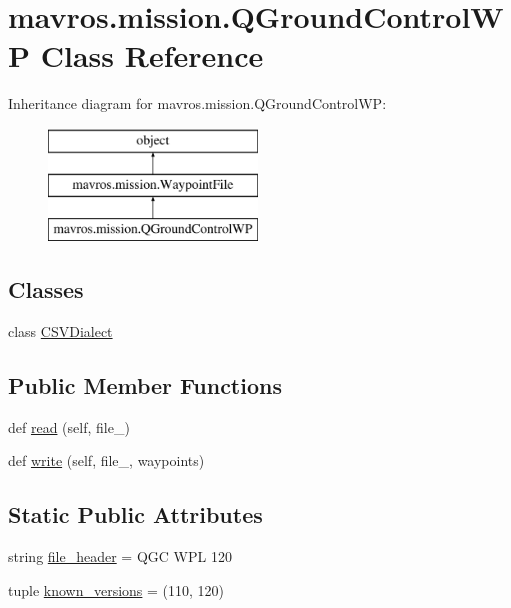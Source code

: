 \hypertarget{classmavros_1_1mission_1_1QGroundControlWP}{}\section{mavros.\+mission.\+Q\+Ground\+Control\+WP Class Reference}
\label{classmavros_1_1mission_1_1QGroundControlWP}
Inheritance diagram for mavros.\+mission.\+Q\+Ground\+Control\+WP\+:\begin{figure}[H]
\begin{center}
\leavevmode
\includegraphics[height=3.000000cm]{classmavros_1_1mission_1_1QGroundControlWP}
\end{center}
\end{figure}
\subsection*{Classes}
\begin{DoxyCompactItemize}
\item 
class \mbox{\hyperlink{classmavros_1_1mission_1_1QGroundControlWP_1_1CSVDialect}{C\+S\+V\+Dialect}}
\end{DoxyCompactItemize}
\subsection*{Public Member Functions}
\begin{DoxyCompactItemize}
\item 
def \mbox{\hyperlink{classmavros_1_1mission_1_1QGroundControlWP_a6b06e2e1e92496e9d0eeb304d2702181}{read}} (self, file\+\_\+)
\item 
def \mbox{\hyperlink{classmavros_1_1mission_1_1QGroundControlWP_a3ade3c33ce488e4f5fb361bfe7ff8e2d}{write}} (self, file\+\_\+, waypoints)
\end{DoxyCompactItemize}
\subsection*{Static Public Attributes}
\begin{DoxyCompactItemize}
\item 
string \mbox{\hyperlink{classmavros_1_1mission_1_1QGroundControlWP_a18fce57e1eb603454951a5f9a1dece7b}{file\+\_\+header}} = \textquotesingle{}Q\+GC W\+PL 120\textquotesingle{}
\item 
tuple \mbox{\hyperlink{classmavros_1_1mission_1_1QGroundControlWP_a4c13ee8890a26f2a76b43ee013bf7b99}{known\+\_\+versions}} = (110, 120)
\end{DoxyCompactItemize}


